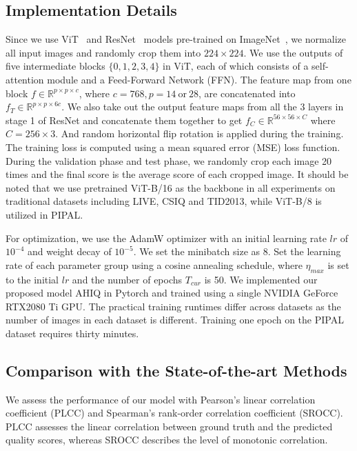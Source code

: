 \documentclass[10pt,twocolumn,letterpaper]{article}
\begin{document}
\subsection{Implementation Details}
Since we use ViT~\cite{dosovitskiy2020image} and ResNet~\cite{he2016deep} models pre-trained on ImageNet~\cite{ILSVRC15}, we normalize all input images and randomly crop them into $224\times224$. We use the outputs of five intermediate blocks $\{0,1,2,3,4\}$ in ViT, each of which consists of a self-attention module and a Feed-Forward Network (FFN). The feature map from one block $f\in \mathbb{R}^{p\times p \times c}$, where $c=768, p=14 \ \text{or} \ 28$, are concatenated into $f_{T}\in \mathbb{R}^{p\times p \times 6c}$. We also take out the output feature maps from all the 3 layers in stage 1 of ResNet and concatenate them together to get $f_{C}\in \mathbb{R}^{56\times 56 \times C}$ where $C=256\times 3$. And random horizontal flip rotation is applied during the training. The training loss is computed using a mean squared error (MSE) loss function. During the validation phase and test phase, we randomly crop each image 20 times and the final score is the average score of each cropped image. It should be noted that we use pretrained ViT-B/16 as the backbone in all experiments on traditional datasets including LIVE, CSIQ and TID2013, while ViT-B/8 is utilized in PIPAL.

For optimization, we use the AdamW optimizer with an initial learning rate $lr$ of $10^{-4}$ and weight decay of $10^{-5}$. We set the minibatch size as 8. Set the learning rate of each parameter group using a cosine annealing schedule, where $\eta_{max}$ is set to the initial $lr$ and the number of epochs $T_{cur}$ is 50. 
We implemented our proposed model AHIQ in Pytorch and trained using a single NVIDIA GeForce RTX2080 Ti GPU. The practical training runtimes differ across datasets as the number of images in each dataset is different. Training one epoch on the PIPAL dataset requires thirty minutes.

\subsection{Comparison with the State-of-the-art Methods}
We assess the performance of our model with Pearson’s linear
correlation coefficient (PLCC) and Spearman’s rank-order correlation coefficient (SROCC). 
PLCC assesses the linear correlation between ground truth and the predicted quality scores, whereas SROCC describes the level of monotonic correlation.
\end{document}
